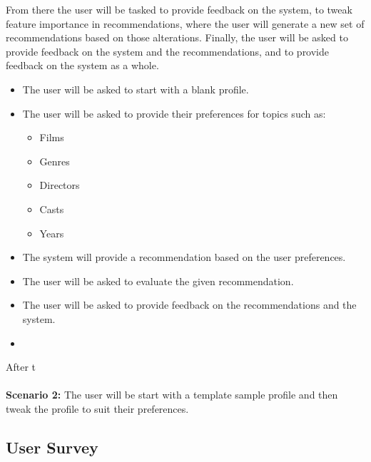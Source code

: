 From there the user will be tasked to provide feedback on the system, to tweak feature importance in recommendations, where the user will generate a new set of recommendations based on those alterations.
Finally, the user will be asked to provide feedback on the system and the recommendations, and to provide feedback on the system as a whole.

\begin{itemize}
    \item The user will be asked to start with a blank profile.
    \item The user will be asked to provide their preferences for topics such as:
    \begin{itemize}
        \item Films
        \item Genres
        \item Directors
        \item Casts
        \item Years
    \end{itemize}
    \item The system will provide a recommendation based on the user preferences.
    \item The user will be asked to evaluate the given recommendation.
    \item The user will be asked to provide feedback on the recommendations and the system.
    \item 
\end{itemize}

After t
\\\\
\textbf{Scenario 2:} The user will be start with a template sample profile and then tweak the profile to suit their preferences.



\subsection{User Survey}
\label{sec:user_survey}



